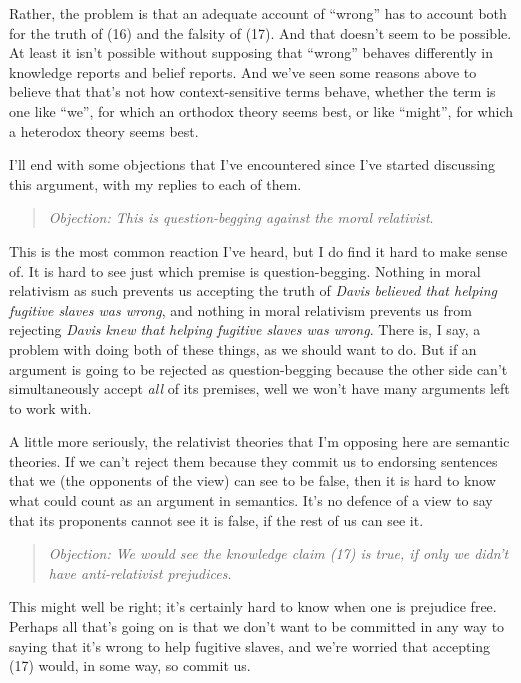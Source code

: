 \documentclass[
  11pt,
  letterpaper,
  DIV=11,
  numbers=noendperiod,
  twoside]{scrartcl}
\begin{document}
Rather, the problem is that an adequate account of ``wrong'' has to
account both for the truth of (16) and the falsity of (17). And that
doesn't seem to be possible. At least it isn't possible without
supposing that ``wrong'' behaves differently in knowledge reports and
belief reports. And we've seen some reasons above to believe that that's
not how context-sensitive terms behave, whether the term is one like
``we'', for which an orthodox theory seems best, or like ``might'', for
which a heterodox theory seems best.

I'll end with some objections that I've encountered since I've started
discussing this argument, with my replies to each of them.

\begin{quote}
\emph{Objection: This is question-begging against the moral relativist}.
\end{quote}

This is the most common reaction I've heard, but I do find it hard to
make sense of. It is hard to see just which premise is question-begging.
Nothing in moral relativism as such prevents us accepting the truth of
\emph{Davis believed that helping fugitive slaves was wrong}, and
nothing in moral relativism prevents us from rejecting \emph{Davis knew
that helping fugitive slaves was wrong}. There is, I say, a problem with
doing both of these things, as we should want to do. But if an argument
is going to be rejected as question-begging because the other side can't
simultaneously accept \emph{all} of its premises, well we won't have
many arguments left to work with.

A little more seriously, the relativist theories that I'm opposing here
are semantic theories. If we can't reject them because they commit us to
endorsing sentences that we (the opponents of the view) can see to be
false, then it is hard to know what could count as an argument in
semantics. It's no defence of a view to say that its proponents cannot
see it is false, if the rest of us can see it.

\begin{quote}
\emph{Objection: We would see the knowledge claim (17) is true, if only
we didn't have anti-relativist prejudices}.
\end{quote}

This might well be right; it's certainly hard to know when one is
prejudice free. Perhaps all that's going on is that we don't want to be
committed in any way to saying that it's wrong to help fugitive slaves,
and we're worried that accepting (17) would, in some way, so commit us.
\end{document}
